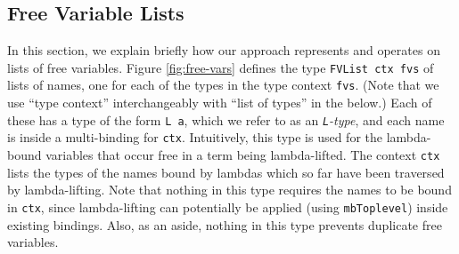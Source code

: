 \documentclass[natbib]{sigplanconf}
\begin{document}


\subsection{Free Variable Lists}
\label{subsec:free-vars}

In this section, we explain briefly how our approach represents and
operates on lists of free variables. Figure \ref{fig:free-vars}
defines the type \lstinline{FVList ctx fvs} of lists of names, one for
each of the types in the type context \lstinline{fvs}. (Note that we
use ``type context'' interchangeably with ``list of types'' in the
below.) Each of these has a type of the form \lstinline{L a}, which we
refer to as an \emph{\lstinline{L}-type}, and each name is inside a
multi-binding for \lstinline{ctx}. Intuitively, this type is used for
the lambda-bound variables that occur free in a term being
lambda-lifted. The context \lstinline{ctx} lists the types of the
names bound by lambdas which so far have been traversed by
lambda-lifting. Note that nothing in this type requires the names to
be bound in \lstinline{ctx}, since lambda-lifting can potentially be
applied (using \lstinline{mbToplevel}) inside existing bindings. Also,
as an aside, nothing in this type prevents duplicate free variables.

\end{document}
